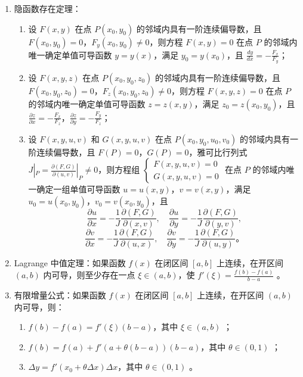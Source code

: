 \documentclass[UTF8]{ctexart}
\theoremstyle{remark}
\begin{document}
\begin{enumerate}
	\item 隐函数存在定理：
	\begin{enumerate}
		\item 设 \(F(x, y)\) 在点 \(P(x_0, y_0)\) 的邻域内具有一阶连续偏导数，且 \(F(x_0, y_0) = 0\)，\(F_y(x_0, y_0) \neq 0\)，则方程 \(F(x, y) = 0\) 在点 \(P\) 的邻域内唯一确定单值可导函数 \(y = y(x)\)，满足 \(y_0 = y(x_0)\)，且 \(\frac{dy}{dx} = -\frac{F_x}{F_y}\)；
		\item 设 \(F(x, y, z)\) 在点 \(P(x_0, y_0, z_0)\) 的邻域内具有一阶连续偏导数，且 \(F(x_0, y_0, z_0) = 0\)，\(F_z(x_0, y_0, z_0) \neq 0\)，则方程 \(F(x, y, z) = 0\) 在点 \(P\) 的邻域内唯一确定单值可导函数 \(z = z(x, y)\)，满足 \(z_0 = z(x_0, y_0)\)，且 \(\frac{\partial z}{\partial x} = -\frac{F_x}{F_z}\)，\(\frac{\partial z}{\partial y} = -\frac{F_y}{F_z}\)；
		\item 设 \(F(x, y, u, v)\) 和 \(G(x, y, u, v)\) 在点 \(P(x_0, y_0, u_0, v_0)\) 的邻域内具有一阶连续偏导数，且 \(F(P) = 0\)，\(G(P) = 0\)，雅可比行列式 \(J|_P = \frac{\partial(F, G)}{\partial(u, v)}|_P \neq 0\)，则方程组 \(\begin{cases} F(x, y, u, v) = 0 \\ G(x, y, u, v) = 0 \end{cases}\) 在点 \(P\) 的邻域内唯一确定一组单值可导函数 \(u = u(x, y)\)，\(v = v(x, y)\)，满足 \(u_0 = u(x_0, y_0)\)，\(v_0 = v(x_0, y_0)\)，且
		\[
		\frac{\partial u}{\partial x} = -\frac{1}{J} \frac{\partial(F, G)}{\partial(x, v)}, \quad \frac{\partial u}{\partial y} = -\frac{1}{J} \frac{\partial(F, G)}{\partial(y, v)},
		\]
		\[
		\frac{\partial v}{\partial x} = -\frac{1}{J} \frac{\partial(F, G)}{\partial(u, x)}, \quad \frac{\partial v}{\partial y} = -\frac{1}{J} \frac{\partial(F, G)}{\partial(u, y)}。
		\]
	\end{enumerate}

	
	\item Lagrange 中值定理：如果函数 \(f(x)\) 在闭区间 \([a, b]\) 上连续，在开区间 \((a, b)\) 内可导，则至少存在一点 \(\xi \in (a, b)\)，使 \(f'(\xi)=\frac{f(b)-f(a)}{b-a}\) 。
	
	\item 有限增量公式：如果函数 \(f(x)\) 在闭区间 \([a, b]\) 上连续，在开区间 \((a, b)\) 内可导，则：
	\begin{enumerate}
		\item \(f(b)-f(a)=f'(\xi)(b-a)\)，其中 \(\xi \in (a, b)\) ；
		\item \(f(b)=f(a)+f'(a+\theta(b-a))(b-a)\)，其中 \(\theta \in (0,1)\) ；
		\item \(\Delta y=f'(x_{0}+\theta \Delta x) \Delta x\)，其中 \(\theta \in (0,1)\) 。
	\end{enumerate}
	

\end{enumerate}
\end{document}
